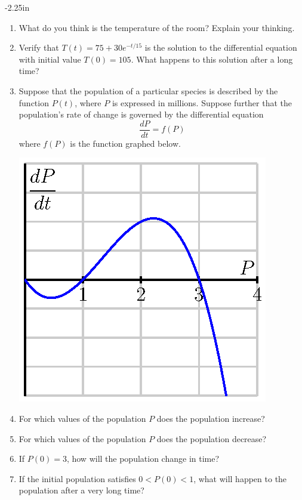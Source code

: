 \begin{adjustwidth*}{}{-2.25in}
\begin{multicols*}{2}
\begin{enumerate}[1)]
        \item What do you think is the temperature of the room?
        Explain your thinking.

        \item Verify that $T(t) = 75 + 30e^{-t/15}$ is the
        solution to the differential equation with initial value $T(0)
        = 105$.  What happens to this solution after a long time?
  \ea
  
  \item Suppose that the population of a particular species is
    described by the function $P(t)$, where $P$ is expressed in
    millions.  Suppose further that the population's rate of change is
    governed by the differential equation 
    $$\frac{dP}{dt} = f(P)
    $$
    where $f(P)$ is the function graphed below.

    \begin{center}
      \includegraphics[scale=.75]{figures/7_1_threshold.eps}
    \end{center}

\ba
    \item For which values of the population $P$ does the population
      increase?

      \item For which values of the population $P$ does the population
      decrease? 

      \item  If $P(0) = 3$, how will the population change in time?

     \item  If the initial population satisfies $0<P(0)<1$, what will
      happen to the population after a very long time?


\end{enumerate}
\end{multicols*}
\end{adjustwidth*}
